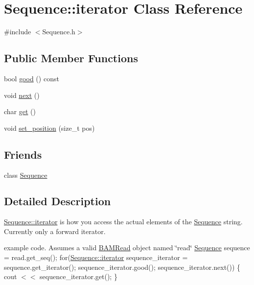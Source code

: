 \hypertarget{class_sequence_1_1iterator}{
\section{Sequence::iterator Class Reference}
\label{class_sequence_1_1iterator}
}


{\ttfamily \#include $<$Sequence.h$>$}

\subsection*{Public Member Functions}
\begin{DoxyCompactItemize}
\item 
bool \hyperlink{class_sequence_1_1iterator_a86e1fd0ddc2d36906a04d23a8374d4b8}{good} () const 
\item 
void \hyperlink{class_sequence_1_1iterator_accddcea1ba9cdd3fe11402612e89c082}{next} ()
\item 
char \hyperlink{class_sequence_1_1iterator_ae93864b1d5a02a44a999cf64f2eb3b34}{get} ()
\item 
void \hyperlink{class_sequence_1_1iterator_ab9bfc2f97bb6cd5cfb87d5dc0e1ee3c3}{set\_\-position} (size\_\-t pos)
\end{DoxyCompactItemize}
\subsection*{Friends}
\begin{DoxyCompactItemize}
\item 
\hypertarget{class_sequence_1_1iterator_a26271d5afaff6e6d3f00c055c63d0b24}{
class \hyperlink{class_sequence_1_1iterator_a26271d5afaff6e6d3f00c055c63d0b24}{Sequence}}
\label{class_sequence_1_1iterator_a26271d5afaff6e6d3f00c055c63d0b24}

\end{DoxyCompactItemize}


\subsection{Detailed Description}
\hyperlink{class_sequence_1_1iterator}{Sequence::iterator} is how you access the actual elements of the \hyperlink{class_sequence}{Sequence} string. Currently only a forward iterator.

example code. Assumes a valid \hyperlink{class_b_a_m_read}{BAMRead} object named \char`\"{}read\char`\"{} \hyperlink{class_sequence}{Sequence} sequence = read.get\_\-seq(); for(\hyperlink{class_sequence_1_1iterator}{Sequence::iterator} sequence\_\-iterator = sequence.get\_\-iterator(); sequence\_\-iterator.good(); sequence\_\-iterator.next()) \{ cout $<$$<$ sequence\_\-iterator.get(); \} 

